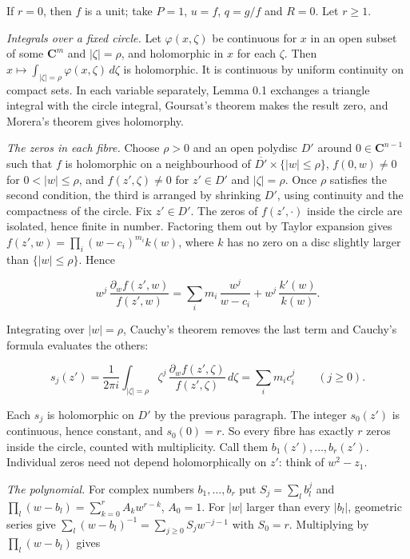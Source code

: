 \documentclass[11pt]{article}
\begin{document}
If \(r=0\), then \(f\) is a unit; take \(P=1\), \(u=f\), \(q=g/f\) and
\(R=0\). Let \(r\geq1\).

\emph{Integrals over a fixed circle.} Let \(\varphi(x,\zeta)\) be
continuous for \(x\) in an open subset of some \(\mathbf C^m\) and
\(|\zeta|=\rho\), and holomorphic in \(x\) for each \(\zeta\). Then
\(x\mapsto\int_{|\zeta|=\rho}\varphi(x,\zeta)\,d\zeta\) is holomorphic.
It is continuous by uniform continuity on compact sets. In each variable
separately, Lemma 0.1 exchanges a triangle integral with the circle
integral, Goursat's theorem makes the result zero, and Morera's theorem
gives holomorphy.

\emph{The zeros in each fibre.} Choose \(\rho>0\) and an open polydisc
\(D'\) around \(0\in\mathbf C^{n-1}\) such that \(f\) is holomorphic on
a neighbourhood of \(\overline{D'}\times\{|w|\leq\rho\}\),
\(f(0,w)\neq0\) for \(0<|w|\leq\rho\), and \(f(z',\zeta)\neq0\) for
\(z'\in D'\) and \(|\zeta|=\rho\). Once \(\rho\) satisfies the second
condition, the third is arranged by shrinking \(D'\), using continuity
and the compactness of the circle. Fix \(z'\in D'\). The zeros of
\(f(z',\cdot)\) inside the circle are isolated, hence finite in number.
Factoring them out by Taylor expansion gives
\(f(z',w)=\prod_i(w-c_i)^{m_i}k(w)\), where \(k\) has no zero on a disc
slightly larger than \(\{|w|\leq\rho\}\). Hence

\[
w^j\,\frac{\partial_wf(z',w)}{f(z',w)}=\sum_im_i\,\frac{w^j}{w-c_i}+w^j\,\frac{k'(w)}{k(w)} .
\]

Integrating over \(|w|=\rho\), Cauchy's theorem removes the last term
and Cauchy's formula evaluates the others:

\[
s_j(z')=\frac1{2\pi i}\int_{|\zeta|=\rho}\zeta^j\,\frac{\partial_wf(z',\zeta)}{f(z',\zeta)}\,d\zeta=\sum_im_ic_i^j\qquad(j\geq0).
\]

Each \(s_j\) is holomorphic on \(D'\) by the previous paragraph. The
integer \(s_0(z')\) is continuous, hence constant, and \(s_0(0)=r\). So
every fibre has exactly \(r\) zeros inside the circle, counted with
multiplicity. Call them \(b_1(z'),\ldots,b_r(z')\). Individual zeros
need not depend holomorphically on \(z'\): think of \(w^2-z_1\).

\emph{The polynomial.} For complex numbers \(b_1,\ldots,b_r\) put
\(S_j=\sum_lb_l^j\) and \(\prod_l(w-b_l)=\sum_{k=0}^rA_kw^{r-k}\),
\(A_0=1\). For \(|w|\) larger than every \(|b_l|\), geometric series
give \(\sum_l(w-b_l)^{-1}=\sum_{j\geq0}S_jw^{-j-1}\) with \(S_0=r\).
Multiplying by \(\prod_l(w-b_l)\) gives
\end{document}
